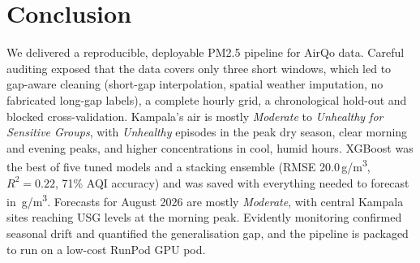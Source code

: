 \documentclass[11pt,a4paper]{article}
\newcommand{\ugm}{\,\textmu g/m\textsuperscript{3}}
\begin{document}
\section{Conclusion}
We delivered a reproducible, deployable PM2.5 pipeline for AirQo data. Careful auditing exposed that the data covers only three short windows, which led to gap-aware cleaning (short-gap interpolation, spatial weather imputation, no fabricated long-gap labels), a complete hourly grid, a chronological hold-out and blocked cross-validation. Kampala's air is mostly \emph{Moderate} to \emph{Unhealthy for Sensitive Groups}, with \emph{Unhealthy} episodes in the peak dry season, clear morning and evening peaks, and higher concentrations in cool, humid hours. XGBoost was the best of five tuned models and a stacking ensemble (RMSE 20.0\ugm, $R^2=0.22$, 71\% AQI accuracy) and was saved with everything needed to forecast in \ugm. Forecasts for August 2026 are mostly \emph{Moderate}, with central Kampala sites reaching USG levels at the morning peak. Evidently monitoring confirmed seasonal drift and quantified the generalisation gap, and the pipeline is packaged to run on a low-cost RunPod GPU pod.
\end{document}
